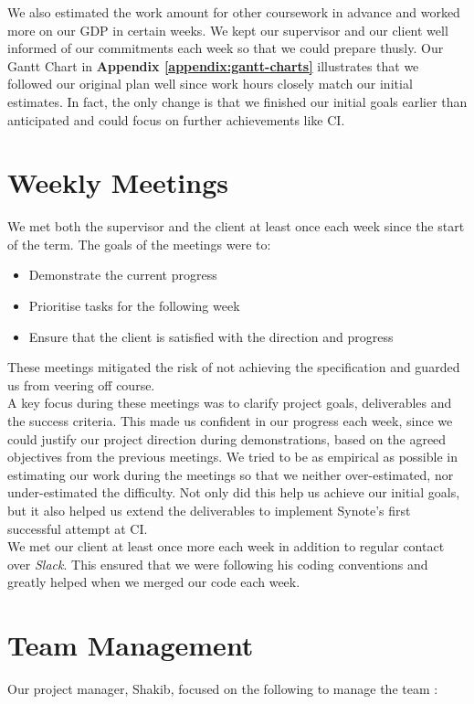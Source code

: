 We also estimated the work amount for other coursework in advance and worked more on our GDP in certain weeks. We kept our supervisor and our client well informed of our commitments each week so that we could prepare thusly. Our Gantt Chart in \textbf{Appendix \ref{appendix:gantt-charts}} illustrates that we followed our original plan well since work hours closely match our initial estimates. In fact, the only change is that we finished our initial goals earlier than anticipated and could focus on further achievements like CI.

\section{Weekly Meetings}
\label{sec:weekly-meetings}
We met both the supervisor and the client at least once each week since the start of the term. The goals of the meetings were to:

\begin{itemize}

  \item Demonstrate the current progress
  \item Prioritise tasks for the following week
  \item Ensure that the client is satisfied with the direction and progress

\end{itemize}

These meetings mitigated the risk of not achieving the specification and guarded us from veering off course.\\

A key focus during these meetings was to clarify project goals, deliverables and the success criteria. This made us confident in our progress each week, since we could justify our project direction during demonstrations, based on the agreed objectives from the previous meetings. We tried to be as empirical as possible in estimating our work during the meetings so that we neither over-estimated, nor under-estimated the difficulty. Not only did this help us achieve our initial goals, but it also helped us extend the deliverables to implement Synote's first successful attempt at CI.\\

We met our client at least once more each week in addition to regular contact over \textit{Slack}. This ensured that we were following his coding conventions and greatly helped when we merged our code each week.

\section{Team Management}
\label{sec:people-management}
Our project manager, Shakib, focused on the following to manage the team \cite{iansommerville2011}:

